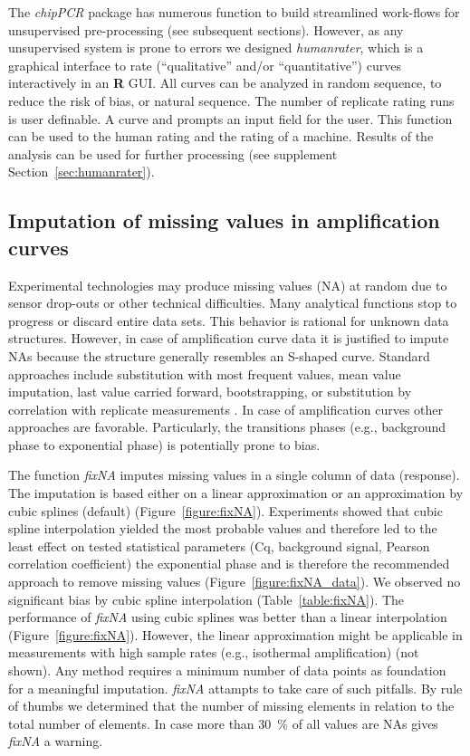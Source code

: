 \documentclass[twocolumn]{bmcart}%
\begin{document}
The \emph{chipPCR} package has numerous function to build streamlined work-flows 
for unsupervised pre-processing (see subsequent sections). However, as any 
unsupervised system is prone to errors we designed \textsl{humanrater}, which is 
a graphical interface to rate (``qualitative'' and/or ``quantitative'') curves 
interactively in an \textbf{R} GUI. All curves can be analyzed in random 
sequence, to reduce the risk of bias, or natural sequence. The number of 
replicate rating runs is user definable. A curve and prompts an input field for 
the user. This function can be used to the human rating and the rating of a 
machine. Results of the analysis can be used for further processing 
(see supplement Section~\ref{sec:humanrater}).

\subsection*{Imputation of missing values in amplification curves}

  Experimental technologies may produce missing values (NA) at 
random due to sensor drop-outs or other technical difficulties. Many analytical 
functions stop to progress or discard entire data sets. This 
behavior is rational for unknown data structures. However, in case of 
amplification curve data it is justified to impute NAs because the structure 
generally resembles an S-shaped curve. Standard approaches include substitution 
with most frequent values, mean value imputation, last value carried forward, 
bootstrapping, or substitution by correlation with replicate measurements 
\cite{Harrell_2001}. In case of amplification curves other approaches are 
favorable. Particularly, the transitions phases (e.g., background phase to 
exponential phase) is potentially prone to bias.

  The function \textsl{fixNA} imputes missing values in a single column 
of data (response). The imputation is based either on a linear approximation or an 
approximation by cubic splines (default) (Figure~\ref{figure:fixNA}). 
Experiments showed that cubic spline interpolation yielded the most probable 
values and therefore led to the least effect on tested statistical parameters 
(Cq, background signal, Pearson correlation coefficient) the exponential phase 
and is therefore the recommended approach to remove missing values 
(Figure~\ref{figure:fixNA_data}). We observed no significant bias by cubic spline 
interpolation (Table~\ref{table:fixNA}). The performance of \textsl{fixNA} using 
cubic splines was better than a linear interpolation (Figure~\ref{figure:fixNA}). 
However, the linear approximation might be applicable in measurements with high 
sample rates (e.g., isothermal amplification) (not shown). Any method requires a 
minimum number of data points as foundation for a meaningful imputation. 
\textsl{fixNA} attampts to take care of such pitfalls. By rule of thumbs we 
determined that the number of missing elements in relation to the total number 
of elements. In case more than 30~\% of all values are NAs gives \textsl{fixNA} 
a warning.
\end{document}
